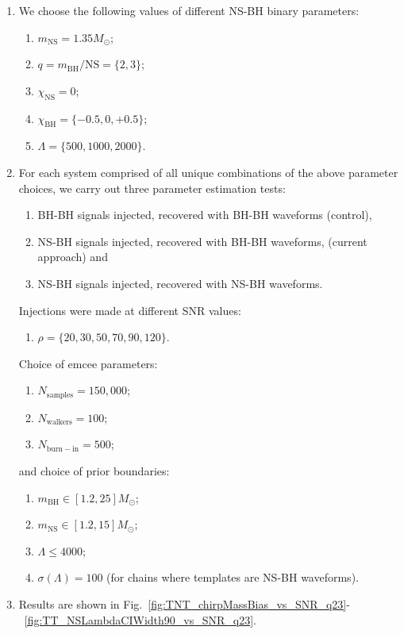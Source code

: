\documentclass[aps,prd,amsmath,floats,floatfix, twocolumn,
superscriptaddress,nofootinbib,showpacs]{revtex4-1}
\begin{document}
\begin{enumerate}
\item We choose the following values of different NS-BH binary parameters:
\begin{enumerate}
\item $m_\mathrm{NS}=1.35M_\odot$;
\item $q=m_\mathrm{BH}/\mathrm{NS}=\{2,3\}$;
\item $\chi_\mathrm{NS}=0$;
\item $\chi_\mathrm{BH}=\{-0.5, 0, +0.5\}$;
\item $\Lambda =\{500,1000,2000\}$.
\end{enumerate}

\item For each system comprised of all unique combinations of the above 
parameter choices, we carry out three parameter estimation tests: 
\begin{enumerate}
\item BH-BH signals injected, recovered with BH-BH waveforms (control),
\item NS-BH signals injected, recovered with BH-BH waveforms, (current approach) and
\item NS-BH signals injected, recovered with NS-BH waveforms.
\end{enumerate}
Injections were made at different SNR values: 
\begin{enumerate}
\item $\rho = \{20, 30, 50, 70, 90, 120\}$.
\end{enumerate}
Choice of emcee parameters:
\begin{enumerate}
\item $N_\mathrm{samples}=150,000$; 
\item $N_\mathrm{walkers}=100$; 
\item $N_\mathrm{burn-in}=500$; 
\end{enumerate}
and choice of prior boundaries:
\begin{enumerate} 
\item $m_\mathrm{BH}\in [1.2, 25]M_\odot$;
\item $m_\mathrm{NS}\in [1.2, 15]M_\odot$;
\item $\Lambda\leq 4000$; 
\item $\sigma\left(\Lambda\right) = 100$ (for chains where templates are NS-BH waveforms).
\end{enumerate}

\item Results are shown in
Fig.~\ref{fig:TNT_chirpMassBias_vs_SNR_q23}-~\ref{fig:TT_NSLambdaCIWidth90_vs_SNR_q23}.

\end{enumerate}
\end{document}

